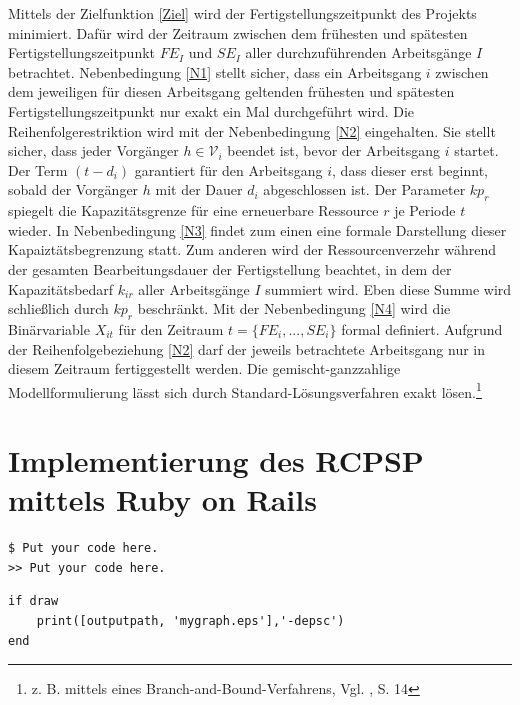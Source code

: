 \documentclass[a4paper,12pt,parskip,bibtotoc,liststotoc]{article}
\begin{document}
Mittels der Zielfunktion \eqref{Ziel} wird der Fertigstellungszeitpunkt des Projekts minimiert. Dafür wird der Zeitraum zwischen dem frühesten und spätesten Fertigstellungszeitpunkt $FE_{I}$ und $SE_{I}$ aller durchzuführenden Arbeitsgänge $I$ betrachtet. Nebenbedingung \eqref{N1} stellt sicher, dass ein Arbeitsgang $i$ zwischen dem jeweiligen für diesen Arbeitsgang geltenden frühesten und spätesten Fertigstellungszeitpunkt nur exakt ein Mal durchgeführt wird. Die Reihenfolgerestriktion wird mit der Nebenbedingung \eqref{N2} eingehalten. Sie stellt sicher, dass jeder Vorgänger $h \in \mathcal{V}_{i}$ beendet ist, bevor der Arbeitsgang $i$ startet. Der Term $(t - d_{i})$ garantiert für den Arbeitsgang $i$, dass dieser erst beginnt, sobald der Vorgänger $h$ mit der Dauer $d_{i}$ abgeschlossen ist.
Der Parameter $kp_{r}$ spiegelt die Kapazitätsgrenze für eine erneuerbare Ressource $r$ je Periode $t$ wieder. In Nebenbedingung \eqref{N3} findet zum einen eine formale Darstellung dieser Kapaiztätsbegrenzung statt. Zum anderen wird der Ressourcenverzehr während der gesamten Bearbeitungsdauer der Fertigstellung beachtet, in dem der Kapazitätsbedarf $k_{ir}$ aller Arbeitsgänge $I$ summiert wird. Eben diese Summe wird schließlich durch $kp_{r}$ beschränkt. %
Mit der Nebenbedingung \eqref{N4} wird die Binärvariable $X_{it}$ für den Zeitraum $t = \{FE_{i},...,SE_{i}\}$ formal definiert. Aufgrund der Reihenfolgebeziehung \eqref{N2} darf der jeweils betrachtete Arbeitsgang nur in diesem Zeitraum fertiggestellt werden.
Die gemischt-ganzzahlige Modellformulierung lässt sich durch Standard-Lösungsverfahren exakt lösen.\footnote{z. B. mittels eines Branch-and-Bound-Verfahrens, Vgl. \cite{kellenbrink2014einfuhrung}, S. 14}


\section{Implementierung des RCPSP mittels Ruby on Rails} \label{Haupt}
\begin{lstlisting}[style=Befehl]
$ Put your code here.
>> Put your code here.
\end{lstlisting}

\begin{lstlisting}[caption=Beispielcode, style=Listing]
if draw
    print([outputpath, 'mygraph.eps'],'-depsc')
end
\end{lstlisting}
\end{document}
